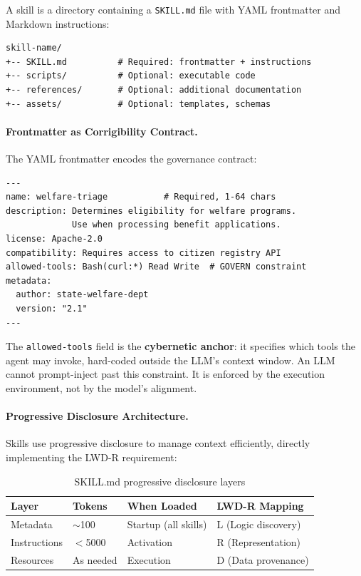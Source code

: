 \documentclass[11pt,a4paper]{article}
\theoremstyle{definition}
\begin{document}
A skill is a directory containing a \texttt{SKILL.md} file with YAML frontmatter and Markdown instructions:

\begin{verbatim}
skill-name/
+-- SKILL.md          # Required: frontmatter + instructions
+-- scripts/          # Optional: executable code
+-- references/       # Optional: additional documentation
+-- assets/           # Optional: templates, schemas
\end{verbatim}

\paragraph{Frontmatter as Corrigibility Contract.} The YAML frontmatter encodes the governance contract:

\begin{verbatim}
---
name: welfare-triage           # Required, 1-64 chars
description: Determines eligibility for welfare programs.
             Use when processing benefit applications.
license: Apache-2.0
compatibility: Requires access to citizen registry API
allowed-tools: Bash(curl:*) Read Write  # GOVERN constraint
metadata:
  author: state-welfare-dept
  version: "2.1"
---
\end{verbatim}

The \texttt{allowed-tools} field is the \textbf{cybernetic anchor}: it specifies which tools the agent may invoke, hard-coded outside the LLM's context window. An LLM cannot prompt-inject past this constraint. It is enforced by the execution environment, not by the model's alignment.

\paragraph{Progressive Disclosure Architecture.} Skills use progressive disclosure to manage context efficiently, directly implementing the LWD-R requirement:

\begin{table}[htbp]
\centering
\small
\caption{SKILL.md progressive disclosure layers}
\label{tab:skill-disclosure}
\begin{tabular}{@{}llll@{}}
\toprule
\textbf{Layer} & \textbf{Tokens} & \textbf{When Loaded} & \textbf{LWD-R Mapping} \\
\midrule
Metadata & $\sim$100 & Startup (all skills) & L (Logic discovery) \\
Instructions & $<$5000 & Activation & R (Representation) \\
Resources & As needed & Execution & D (Data provenance) \\
\bottomrule
\end{tabular}
\end{table}
\end{document}
